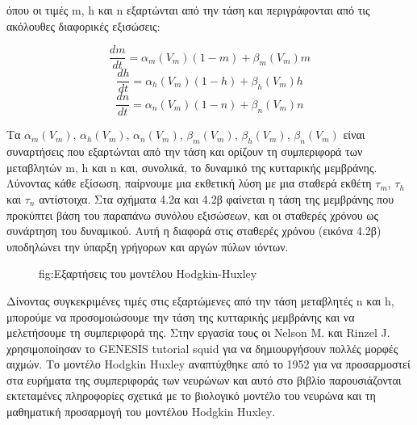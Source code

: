 \documentclass[12pt]{report}
\begin{document}
όπου οι τιμές \textlatin{m, h} και \textlatin{n} εξαρτώνται από την τάση και περιγράφονται από τις ακόλουθες διαφορικές εξισώσεις:

\begin{equation}
\frac{dm}{dt}=\alpha_m(V_m)(1-m)+\beta_m(V_m)m
\end{equation}
\begin{equation}
\frac{dh}{dt}=\alpha_h(V_m)(1-h)+\beta_h(V_m)h
\end{equation}
\begin{equation}
\frac{dn}{dt}=\alpha_n(V_m)(1-n)+\beta_n(V_m)n
\end{equation}

Τα \(\alpha_m (V_m)\), \(\alpha_h (V_m)\), \(\alpha_n (V_m)\), \(\beta_m (V_m)\), \(\beta_h (V_m)\), \(\beta_n (V_m)\) είναι συναρτήσεις που εξαρτώνται από την τάση και ορίζουν τη συμπεριφορά των μεταβλητών \textlatin{m, h} και \textlatin{n} και, συνολικά, το δυναμικό της κυτταρικής μεμβράνης. Λύνοντας κάθε εξίσωση, παίρνουμε μια εκθετική λύση με μια σταθερά εκθέτη \(\tau_m\), \(\tau_h\) και \(\tau_n\) αντίστοιχα. Στα σχήματα 4.2α και 4.2β φαίνεται η τάση της μεμβράνης που προκύπτει βάση του παραπάνω συνόλου εξισώσεων, και οι σταθερές χρόνου ως συνάρτηση του δυναμικού. Αυτή η διαφορά στις σταθερές χρόνου (εικόνα 4.2β) υποδηλώνει την ύπαρξη γρήγορων και αργών πύλων ιόντων.

\begin{figure}[htp]
    \centering
    \hfill
    \caption{fig:Εξαρτήσεις του μοντέλου \textlatin{Hodgkin-Huxley}}
\end{figure}

Δίνοντας συγκεκριμένες τιμές στις εξαρτώμενες από την τάση μεταβλητές \textlatin{n} και \textlatin{h}, μπορούμε να προσομοιώσουμε την τάση της κυτταρικής μεμβράνης και να μελετήσουμε τη συμπεριφορά της. Στην εργασία τους \cite{NelsonM} οι \textlatin{Nelson M.} και \textlatin{Rinzel J.} χρησιμοποίησαν το \textlatin{GENESIS tutorial squid} \cite{squid} για να δημιουργήσουν πολλές μορφές αιχμών. Το μοντέλο \textlatin{Hodgkin Huxley} αναπτύχθηκε από το 1952 για να προσαρμοστεί στα ευρήματα της συμπεριφοράς των νευρώνων και αυτό στο βιβλίο \cite{gerstner2014} παρουσιάζονται εκτεταμένες πληροφορίες σχετικά με το βιολογικό μοντέλο του νευρώνα και τη μαθηματική προσαρμογή του μοντέλου \textlatin{Hodgkin Huxley}.
\end{document}
